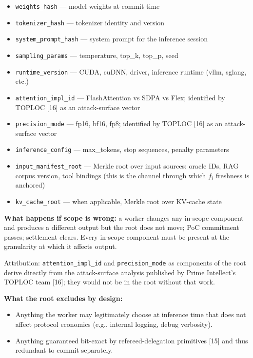 \documentclass[11pt]{article}
\begin{document}
\begin{itemize}
\item \texttt{weights\_hash} --- model weights at commit time
\item \texttt{tokenizer\_hash} --- tokenizer identity and version
\item \texttt{system\_prompt\_hash} --- system prompt for the inference session
\item \texttt{sampling\_params} --- temperature, top\_k, top\_p, seed
\item \texttt{runtime\_version} --- CUDA, cuDNN, driver, inference runtime (vllm, sglang, etc.)
\item \texttt{attention\_impl\_id} --- FlashAttention vs SDPA vs Flex; identified by TOPLOC [16] as an attack-surface vector
\item \texttt{precision\_mode} --- fp16, bf16, fp8; identified by TOPLOC [16] as an attack-surface vector
\item \texttt{inference\_config} --- max\_tokens, stop sequences, penalty parameters
\item \texttt{input\_manifest\_root} --- Merkle root over input sources: oracle IDs, RAG corpus version, tool bindings (this is the channel through which $f_i$ freshness is anchored)
\item \texttt{kv\_cache\_root} --- when applicable, Merkle root over KV-cache state
\end{itemize}

\textbf{What happens if scope is wrong:} a worker changes any in-scope component and produces a different output but the root does not move; PoC commitment passes; settlement clears. Every in-scope component must be present at the granularity at which it affects output.

Attribution: \texttt{attention\_impl\_id} and \texttt{precision\_mode} as components of the root derive directly from the attack-surface analysis published by Prime Intellect's TOPLOC team [16]; they would not be in the root without that work.

\textbf{What the root excludes by design:}
\begin{itemize}
\item Anything the worker may legitimately choose at inference time that does not affect protocol economics (e.g., internal logging, debug verbosity).
\item Anything guaranteed bit-exact by refereed-delegation primitives [15] and thus redundant to commit separately.
\end{itemize}
\end{document}

